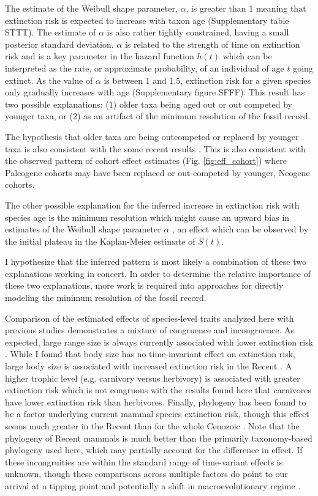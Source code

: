\documentclass[12pt]{article}
\begin{document}
The estimate of the Weibull shape parameter, $\alpha$, is greater than 1 meaning that extinction risk is expected to increase with taxon age (Supplementary table STTT). The estimate of $\alpha$ is also rather tightly constrained, having a small posterior standard deviation. $\alpha$ is related to the strength of time on extinction risk and is a key parameter in the hazard function $h(t)$ which can be interpreted as the rate, or approximate probability, of an individual of age $t$ going extinct. As the value of $\alpha$ is between 1 and 1.5, extinction risk for a given species only gradually increases with age (Supplementary figure SFFF). This result has two possible explanations: (1) older taxa being aged out or out competed by younger taxa, or (2) as an artifact of the minimum resolution of the fossil record.

The hypothesis that older taxa are being outcompeted or replaced by younger taxa is also consistent with the some recent results \cite{Wagner2014b,Quental2013}. This is also consistent with the observed pattern of cohort effect estimates (Fig. \ref{fig:eff_cohort}) where Paleogene cohorts may have been replaced or out-competed by younger, Neogene cohorts.

The other possible explanation for the inferred increase in extinction risk with species age is the minimum resolution which might cause an upward bias in estimates of the Weibull shape parameter \(\alpha\) \cite{Sepkoski1975}, an effect which can be observed by the initial plateau in the Kaplan-Meier estimate of $S(t)$. 

I hypothesize that the inferred pattern is most likely a combination of these two explanations working in concert. In order to determine the relative importance of these two explanations, more work is required into approaches for directly modeling the minimum resolution of the fossil record.


Comparison of the estimated effects of species-level traits analyzed here with previous studies demonstrates a mixture of congruence and incongruence. As expected, large range size is always currently associated with lower extinction risk \cite{Fritz2009,Fritz2010b,Liow2009,Purvis2000a}. While I found that body size has no time-invariant effect on extinction risk, large body size is associated with increased extinction risk in the Recent \cite{Liow2009,Fritz2009,Purvis2000a}. A higher trophic level (e.g. carnivory versus herbivory) is associated with greater extinction risk \cite{Purvis2000a} which is not congruous with the results found here that carnivores have lower extinction risk than herbivores. Finally, phylogeny has been found to be a factor underlying current mammal species extinction risk, though this effect seems much greater in the Recent than for the whole Cenozoic \cite{Fritz2010b}. Note that the phylogeny of Recent mammals is much better than the primarily taxonomy-based phylogeny used here, which may partially account for the difference in effect. If these incongruities are within the standard range of time-variant effects is unknown, though these comparisons across multiple factors do point to our arrival at a tipping point \cite{Barnosky2012a,Barnosky2011} and potentially a shift in macroevolutionary regime \cite{Jablonski1986}.
\end{document}
